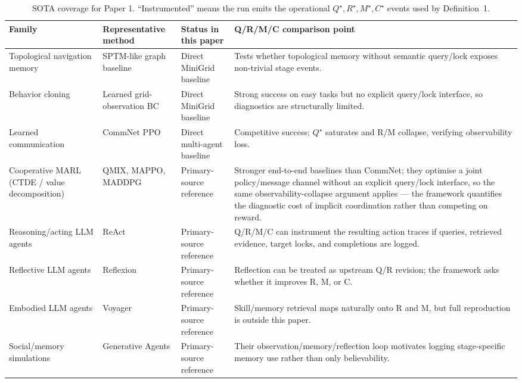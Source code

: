 \documentclass{article}
\begin{document}
\begin{table}[h]
\caption{SOTA coverage for Paper 1. ``Instrumented'' means the run emits the operational $Q^\star,R^\star,M^\star,C^\star$ events used by Definition~1.}
\label{tab:sota-coverage}
\centering
\small
\begin{tabular}{p{2.45cm}p{2.55cm}p{2.7cm}p{4.0cm}}
\toprule
Family & Representative method & Status in this paper & Q/R/M/C comparison point \\
\midrule
Topological navigation memory & SPTM-like graph baseline \citep{savinov2018semi} & Direct MiniGrid baseline & Tests whether topological memory without semantic query/lock exposes non-trivial stage events. \\
Behavior cloning & Learned grid-observation BC & Direct MiniGrid baseline & Strong success on easy tasks but no explicit query/lock interface, so diagnostics are structurally limited. \\
Learned communication & CommNet PPO \citep{sukhbaatar2016commnet,schulman2017proximal} & Direct multi-agent baseline & Competitive success; $Q^\star$ saturates and R/M collapse, verifying observability loss. \\
Cooperative MARL (CTDE / value decomposition) & QMIX, MAPPO, MADDPG \citep{rashid2018qmix,yu2022mappo,lowe2017maddpg} & Primary-source reference & Stronger end-to-end baselines than CommNet; they optimise a joint policy/message channel without an explicit query/lock interface, so the same observability-collapse argument applies --- the framework quantifies the diagnostic cost of implicit coordination rather than competing on reward. \\
Reasoning/acting LLM agents & ReAct \citep{yao2022react} & Primary-source reference & Q/R/M/C can instrument the resulting action traces if queries, retrieved evidence, target locks, and completions are logged. \\
Reflective LLM agents & Reflexion \citep{shinn2023reflexion} & Primary-source reference & Reflection can be treated as upstream Q/R revision; the framework asks whether it improves R, M, or C. \\
Embodied LLM agents & Voyager \citep{wang2023voyager} & Primary-source reference & Skill/memory retrieval maps naturally onto R and M, but full reproduction is outside this paper. \\
Social/memory simulations & Generative Agents \citep{park2023generative} & Primary-source reference & Their observation/memory/reflection loop motivates logging stage-specific memory use rather than only believability. \\

\end{tabular}
\end{table}
\end{document}
